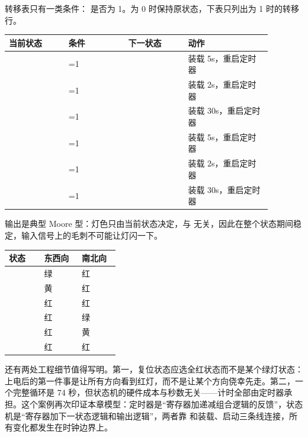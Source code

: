 转移表只有一类条件： 是否为 1。为 0 时保持原状态，下表只列出为 1 时的转移行。

\begin{longtable}{L{0.2\linewidth}L{0.2\linewidth}L{0.2\linewidth}L{0.28\linewidth}}
\toprule
当前状态 & 条件 & 下一状态 & 动作 \\
\midrule
{} & =1 &  & 装载 5s，重启定时器 \\
 & =1 &  & 装载 2s，重启定时器 \\
 & =1 &  & 装载 30s，重启定时器 \\
 & =1 &  & 装载 5s，重启定时器 \\
 & =1 &  & 装载 2s，重启定时器 \\
 & =1 &  & 装载 30s，重启定时器 \\
\bottomrule
\end{longtable}

输出是典型 Moore 型：灯色只由当前状态决定，与  无关，因此在整个状态期间稳定，输入信号上的毛刺不可能让灯闪一下。

\begin{longtable}{L{0.28\linewidth}L{0.3\linewidth}L{0.3\linewidth}}
\toprule
状态 & 东西向 & 南北向 \\
\midrule
{} & 绿 & 红 \\
 & 黄 & 红 \\
 & 红 & 红 \\
 & 红 & 绿 \\
 & 红 & 黄 \\
 & 红 & 红 \\
\bottomrule
\end{longtable}

还有两处工程细节值得写明。第一，复位状态应选全红状态而不是某个绿灯状态：上电后的第一件事是让所有方向看到红灯，而不是让某个方向侥幸先走。第二，一个完整循环是 74 秒，但状态机的硬件成本与秒数无关——计时全部由定时器承担。这个案例再次印证本章模型：定时器是“寄存器加递减组合逻辑的反馈”，状态机是“寄存器加下一状态逻辑和输出逻辑”，两者靠  和装载、启动三条线连接，所有变化都发生在时钟边界上。


